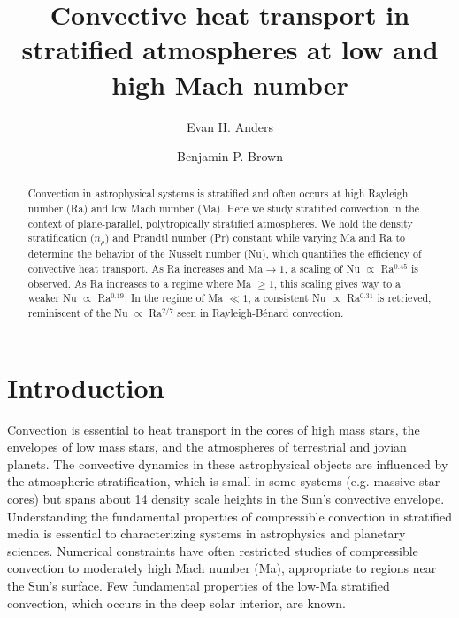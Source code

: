 \documentclass[aps, prl, twocolumn, nofootinbib, groupedaddress, amsfonts, amssymb, amsmath]{revtex4-1}
\newcommand{\RB}{Rayleigh-B\'{e}nard }
\newcommand{\nrho}{\ensuremath{n_{\rho}}}
\begin{document}
\author{Evan H. Anders}
\author{Benjamin P. Brown}
\title{Convective heat transport in stratified atmospheres at low and high Mach number}

\begin{abstract}
Convection in astrophysical systems is stratified and
often occurs at high Rayleigh number (Ra) and low
Mach number (Ma).
Here we study stratified convection in the context of 
plane-parallel, polytropically stratified atmospheres. 
We hold the density stratification (\nrho) and Prandtl 
number (Pr) constant while varying
Ma and Ra to determine 
the behavior of the Nusselt number (Nu), 
which quantifies the efficiency of convective heat transport.
As Ra increases and $\text{Ma} \rightarrow 1$, a scaling 
of Nu $\propto$ Ra$^{0.45}$ is observed.  
As Ra increases to a regime where Ma $\geq 1$,
this scaling gives way to a weaker Nu $\propto$ Ra$^{0.19}$. 
In the regime of Ma $\ll 1$, a consistent
Nu $\propto$ Ra$^{0.31}$ is retrieved,  reminiscent of the 
Nu $\propto$ Ra$^{2/7}$ seen in \RB convection.
\end{abstract}
\maketitle


\section{Introduction}
\label{sec:intro}
Convection is essential to heat transport in the cores of high mass stars,
the envelopes of low mass stars, and the atmospheres of terrestrial and 
jovian planets.  The convective dynamics in these astrophysical objects
are influenced by the atmospheric 
stratification, which is small in some systems (e.g. massive star cores)
but spans about
14 density scale heights in the Sun's convective envelope.
Understanding the fundamental
properties of compressible convection in stratified media is essential
to characterizing systems in astrophysics and planetary sciences.  
Numerical constraints have often restricted studies of compressible
convection to moderately high Mach number (Ma), appropriate to regions near 
the Sun's surface.  Few fundamental properties of the 
low-Ma stratified convection, which occurs in the deep solar interior, are known.
\end{document}
